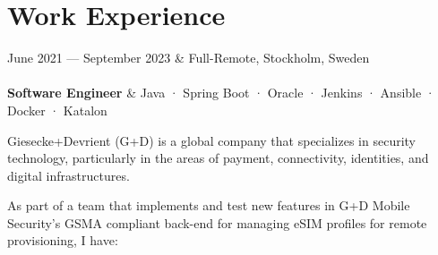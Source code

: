 \documentclass{cv-stylish}
\begin{document}
\begin{center}
\begin{adjustwidth}{1cm}{1cm}



\end{adjustwidth}


\section{Work Experience}


\begin{JobTable}
  June 2021 --- September 2023 & \hfill Full-Remote, Stockholm, Sweden \\
   \\[3pt]
  \hspace{5mm} \textbf{Software Engineer}
  & \hfill Java · Spring Boot · Oracle · Jenkins · Ansible · Docker · Katalon \\
\end{JobTable}
\begin{InfoBody}
Giesecke+Devrient (G+D) is a global company that specializes in
security technology, particularly in the areas of payment,
connectivity, identities, and digital infrastructures.

As part of a team that implements and test new features in G+D Mobile
Security's GSMA compliant back-end for managing eSIM profiles for
remote provisioning, I have:


\end{InfoBody}
\end{center}
\end{document}
